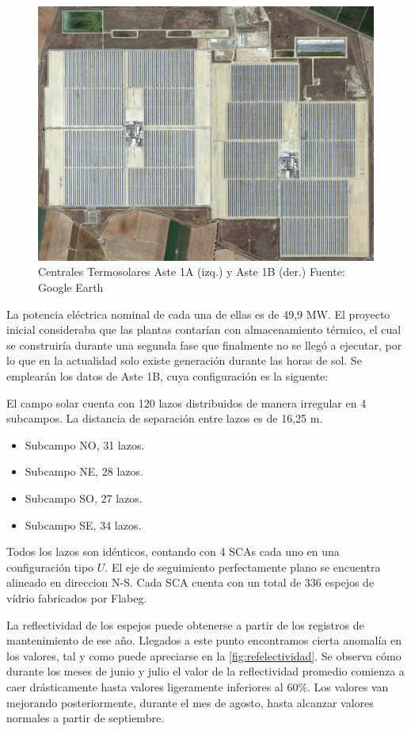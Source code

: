 \begin{figure}[!h]
\includegraphics[width=0.9\linewidth]{images/fotoAstes.png}
\caption{Centrales Termosolares Aste 1A (izq.) y Aste 1B (der.) Fuente: Google Earth} 
\label{fig:astes}
\end{figure}

La potencia eléctrica nominal de cada una de ellas es de 49,9 MW. El proyecto inicial consideraba que las plantas contarían con almacenamiento térmico, el cual se construiría durante una segunda fase que finalmente no se llegó a ejecutar, por lo que en la actualidad solo existe generación durante las horas de sol. Se emplearán los datos de Aste 1B, cuya configuración es la siguente:

El campo solar cuenta con 120 lazos distribuidos de manera irregular en 4 subcampos. La  distancia de separación entre lazos es de 16,25 m. 

\begin{itemize}[itemsep=2pt,parsep=2pt]
\item
  Subcampo NO, 31 lazos.
\item
  Subcampo NE, 28 lazos.
\item
  Subcampo SO, 27 lazos.
\item
  Subcampo SE, 34 lazos.
\end{itemize}

Todos los lazos son idénticos, contando con 4 SCAs cada uno en una configuración tipo \(U\). El eje de seguimiento perfectamente plano se encuentra alineado en direccion N-S. Cada SCA cuenta con un total de 336 espejos de vídrio fabricados por Flabeg. 

La reflectividad de los espejos puede obtenerse a partir de los registros de mantenimiento de ese año. Llegados a este punto encontramos cierta anomalía en los valores, tal y como puede apreciarse en la \ref{fig:refelectividad}. Se observa cómo durante los meses de junio y julio el valor de la reflectividad promedio comienza a caer drásticamente hasta valores ligeramente inferiores al 60\%. Los valores van mejorando posteriormente, durante el mes de agosto, hasta alcanzar valores normales a partir de septiembre.


